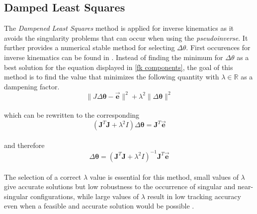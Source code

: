 \subsection{Damped Least Squares}
 The \textit{Dampened Least Squares} method is applied for inverse kinematics as it avoids the singularity problems that can occur when using the \textit{pseudoinverse}. It further provides a numerical stable method for selecting $\Delta\theta$. First occurences for inverse kinematics can be found in \cite{Wampler.1986,Nakamura.1986}.
Instead of finding the minimum for $\Delta\theta$ as a best solution for the equation displayed in \ref{fk components}, the goal of this method is to find the value that minimizes the following quantity with $\lambda \in \mathbb{R} $ as a dampening factor.\\
\begin{equation}
\parallel J\Delta\pmb{\theta}-\vec{\pmb{e}}\parallel^{2}+\lambda^{2}\parallel\Delta\pmb{\theta}\parallel^{2}
\end{equation}
\\which can be rewritten to the corresponding \\
\begin{equation}
(\pmb{J}^{T}\pmb{J}+\lambda^{2}I)\Delta\pmb{\theta}=\pmb{J}^{T}\vec{\pmb{e}}
\end{equation}
\\and therefore\\
\begin{equation}
\Delta\pmb{\theta}=(\pmb{J}^{T}\pmb{J}+\lambda^{2}I)^{-1}\pmb{J}^{T}\vec{\pmb{e}}
\end{equation}
\\The selection of a correct $\lambda$ value is essential for this method, small values of $\lambda$ give accurate solutions but low robustness to the occurrence of singular and near-singular configurations, while large values of $\lambda$ result in low tracking accuracy even when a feasible and accurate solution would be possible \cite{Chiaverini.1994,AndreasAristidouandJoanLasenby.2009}.

